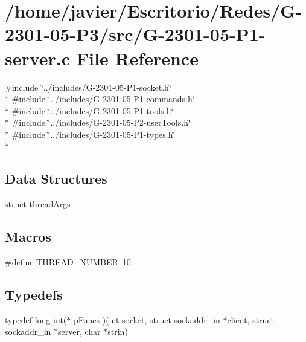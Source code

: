 \hypertarget{_g-2301-05-_p1-server_8c}{\section{/home/javier/\-Escritorio/\-Redes/\-G-\/2301-\/05-\/\-P3/src/\-G-\/2301-\/05-\/\-P1-\/server.c File Reference}
\label{_g-2301-05-_p1-server_8c}
}
{\ttfamily \#include \char`\"{}../includes/\-G-\/2301-\/05-\/\-P1-\/socket.\-h\char`\"{}}\\*
{\ttfamily \#include \char`\"{}../includes/\-G-\/2301-\/05-\/\-P1-\/commands.\-h\char`\"{}}\\*
{\ttfamily \#include \char`\"{}../includes/\-G-\/2301-\/05-\/\-P1-\/tools.\-h\char`\"{}}\\*
{\ttfamily \#include \char`\"{}../includes/\-G-\/2301-\/05-\/\-P2-\/user\-Tools.\-h\char`\"{}}\\*
{\ttfamily \#include \char`\"{}../includes/\-G-\/2301-\/05-\/\-P1-\/types.\-h\char`\"{}}\\*
\subsection*{Data Structures}
\begin{DoxyCompactItemize}
\item 
struct \hyperlink{structthread_args}{thread\-Args}
\end{DoxyCompactItemize}
\subsection*{Macros}
\begin{DoxyCompactItemize}
\item 
\#define \hyperlink{_g-2301-05-_p1-server_8c_adc5a02a0d82a5e7fd93802b082e24102}{T\-H\-R\-E\-A\-D\-\_\-\-N\-U\-M\-B\-E\-R}~10
\end{DoxyCompactItemize}
\subsection*{Typedefs}
\begin{DoxyCompactItemize}
\item 
typedef long int($\ast$ \hyperlink{_g-2301-05-_p1-server_8c_af4fbc62d68085a32b47e88d447b77b28}{p\-Funcs} )(int socket, struct sockaddr\-\_\-in $\ast$client, struct sockaddr\-\_\-in $\ast$server, char $\ast$strin)
\end{DoxyCompactItemize}
